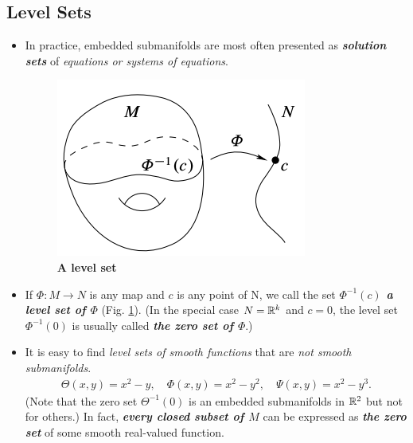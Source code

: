 \documentclass[11pt]{article}
\begin{document}
\subsection{Level Sets}
\begin{itemize}
\item \begin{remark}
In practice, embedded submanifolds are most often presented as \emph{\textbf{solution sets}} of \emph{equations or systems of equations}.
\end{remark}

\begin{figure}
\begin{minipage}[htb]{1\linewidth}
  \centering
  \centerline{\includegraphics[scale = 0.45]{level_sets.png}}
\end{minipage}
\caption{\footnotesize{\textbf{A level set  \citep{lee2003introduction}}}}
\label{fig: level_sets}
\end{figure}

\item \begin{definition}
If $\Phi: M \rightarrow N$ is any map and $c$ is any point of N, we call the set \emph{\textbf{$\Phi^{-1}(c)$ a level set of $\Phi$}} (Fig. \ref{fig: level_sets}). (In the special case $N = {\mathbb R}^k$ and $c = 0$, the level set $\Phi^{-1}(0)$ is usually called \emph{\textbf{the zero set of $\Phi$}}.)
\end{definition}

\item \begin{remark}
It is easy to find \emph{level sets of smooth functions} that are \emph{not smooth submanifolds}. 
\begin{align*}
\Theta(x,y)  = x^2 - y, \quad \Phi(x,y) = x^2 - y^2, \quad  \Psi(x, y) = x^2 -y^3.
\end{align*} (Note that the zero set $\Theta^{-1}(0)$ is an embedded submanifolds in ${\mathbb R}^{2}$ but not for others.) In fact, \emph{\textbf{every closed subset of $M$}} can be expressed as \emph{\textbf{the zero set}} of some smooth real-valued function.
\end{remark}


\end{itemize}
\end{document}
